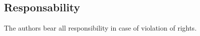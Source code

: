 \documentclass{article}
\begin{document}





\subsection{Responsability}
The authors bear all responsibility in case of violation of rights.
\end{document}
